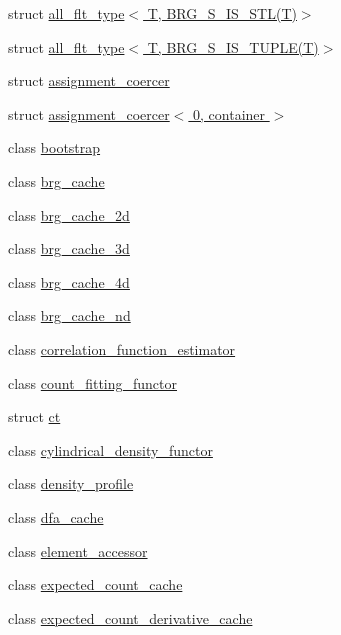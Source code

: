 \begin{DoxyCompactItemize}
\item 
struct \hyperlink{namespaceIceBRG_structIceBRG_1_1all__flt__type_3_01T_00_01BRG__S__IS__STL_07T_08_4}{all\+\_\+flt\+\_\+type$<$ T, B\+R\+G\+\_\+\+S\+\_\+\+I\+S\+\_\+\+S\+T\+L(\+T)$>$}
\item 
struct \hyperlink{namespaceIceBRG_structIceBRG_1_1all__flt__type_3_01T_00_01BRG__S__IS__TUPLE_07T_08_4}{all\+\_\+flt\+\_\+type$<$ T, B\+R\+G\+\_\+\+S\+\_\+\+I\+S\+\_\+\+T\+U\+P\+L\+E(\+T)$>$}
\item 
struct \hyperlink{structIceBRG_1_1assignment__coercer}{assignment\+\_\+coercer}
\item 
struct \hyperlink{structIceBRG_1_1assignment__coercer_3_010_00_01container_01_4}{assignment\+\_\+coercer$<$ 0, container $>$}
\item 
class \hyperlink{classIceBRG_1_1bootstrap}{bootstrap}
\item 
class \hyperlink{classIceBRG_1_1brg__cache}{brg\+\_\+cache}
\item 
class \hyperlink{classIceBRG_1_1brg__cache__2d}{brg\+\_\+cache\+\_\+2d}
\item 
class \hyperlink{classIceBRG_1_1brg__cache__3d}{brg\+\_\+cache\+\_\+3d}
\item 
class \hyperlink{classIceBRG_1_1brg__cache__4d}{brg\+\_\+cache\+\_\+4d}
\item 
class \hyperlink{classIceBRG_1_1brg__cache__nd}{brg\+\_\+cache\+\_\+nd}
\item 
class \hyperlink{classIceBRG_1_1correlation__function__estimator}{correlation\+\_\+function\+\_\+estimator}
\item 
class \hyperlink{classIceBRG_1_1count__fitting__functor}{count\+\_\+fitting\+\_\+functor}
\item 
struct \hyperlink{namespaceIceBRG_structIceBRG_1_1ct}{ct}
\item 
class \hyperlink{classIceBRG_1_1cylindrical__density__functor}{cylindrical\+\_\+density\+\_\+functor}
\item 
class \hyperlink{classIceBRG_1_1density__profile}{density\+\_\+profile}
\item 
class \hyperlink{classIceBRG_1_1dfa__cache}{dfa\+\_\+cache}
\item 
class \hyperlink{classIceBRG_1_1element__accessor}{element\+\_\+accessor}
\item 
class \hyperlink{classIceBRG_1_1expected__count__cache}{expected\+\_\+count\+\_\+cache}
\item 
class \hyperlink{classIceBRG_1_1expected__count__derivative__cache}{expected\+\_\+count\+\_\+derivative\+\_\+cache}

\end{DoxyCompactItemize}
